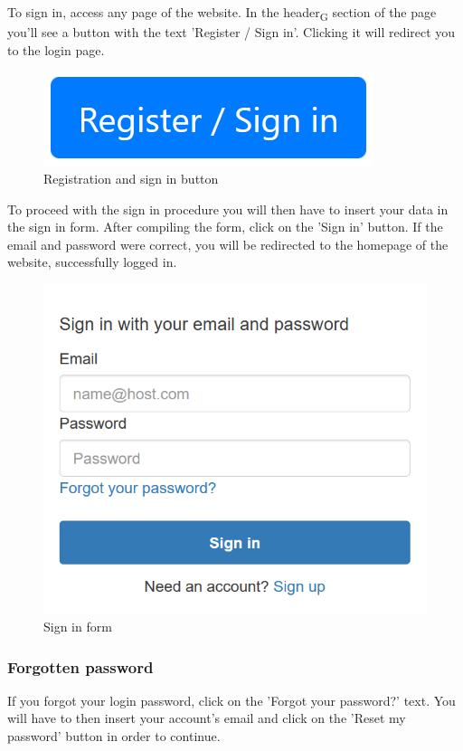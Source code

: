 To sign in, access any page of the website. In the header\textsubscript{G} section of the page you'll see a button with the text 'Register / Sign in'. Clicking it will redirect you to the login page.

\begin{figure}[H]
\centering
\includegraphics[scale=0.6]{res/Immagini/RegisterSigninButton}
\caption{Registration and sign in button}
\end{figure}

To proceed with the sign in procedure you will then have to insert your data in the sign in form. After compiling the form, click on the 'Sign in' button. If the email and password were correct, you will be redirected to the homepage of the website, successfully logged in.

\begin{figure}[H]
\centering
\includegraphics[scale=0.6]{res/Immagini/SigninForm}
\caption{Sign in form}
\end{figure}

\subsubsection{Forgotten password}
If you forgot your login password, click on the 'Forgot your password?' text. You will have to then insert your account's email and click on the 'Reset my password' button in order to continue.

